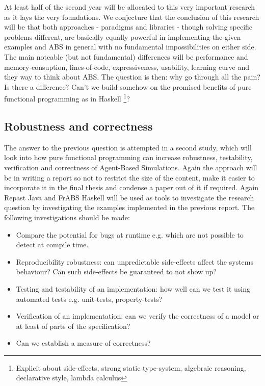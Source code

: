 At least half of the second year will be allocated to this very important research as it lays the very foundations. We conjecture that the conclusion of this research will be that both approaches - paradigms and libraries - though solving specific problems different, are basically equally powerful in implementing the given examples and ABS in general with no fundamental impossibilities on either side. The main noteable (but not fundamental) differences will be performance and memory-consuption, lines-of-code, expressiveness, usability, learning curve and they way to think about ABS.
The question is then: why go through all the pain? Is there a difference? Can't we build somehow on the promised benefits of pure functional programming as in Haskell \footnote{Explicit about side-effects, strong static type-system, algebraic reasoning, declarative style, lambda calculus}?

\subsection{Robustness and correctness}
The answer to the previous question is attempted in a second study, which will look into how pure functional programming can increase robustness, testability, verification and correctness of Agent-Based Simulations. Again the approach will be in writing a report so not to restrict the size of the content, make it easier to incorporate it in the final thesis and condense a paper out of it if required.
Again Repast Java and FrABS Haskell will be used as tools to investigate the research question by investigating the examples implemented in the previous report. The following investigations should be made:

\begin{itemize}
	\item Compare the potential for bugs at runtime e.g. which are not possible to detect at compile time. 
	\item Reproducibility robustness: can unpredictable side-effects affect the systems behaviour? Can such side-effects be guaranteed to not show up? 
	\item Testing and testability of an implementation: how well can we test it using automated tests e.g. unit-tests, property-tests?
	\item Verification of an implementation: can we verify the correctness of a model or at least of parts of the specification?
	\item Can we establish a measure of correctness?
\end{itemize}

